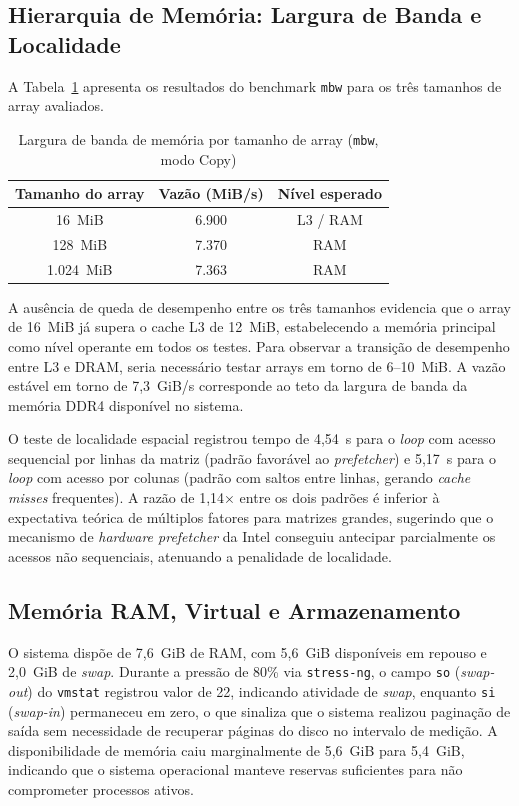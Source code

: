 \documentclass[12pt]{article}
\begin{document}
\subsection{Hierarquia de Memória: Largura de Banda e Localidade}

A Tabela~\ref{tab:mbw} apresenta os resultados do benchmark \texttt{mbw} para os três tamanhos de array avaliados.

\begin{table}[H]
\centering
\caption{Largura de banda de memória por tamanho de array (\texttt{mbw}, modo Copy)}
\label{tab:mbw}
\begin{tabular}{ccc}
\toprule
\textbf{Tamanho do array} & \textbf{Vazão (MiB/s)} & \textbf{Nível esperado} \\
\midrule
16~MiB   & 6.900  & L3 / RAM \\
128~MiB  & 7.370  & RAM \\
1.024~MiB & 7.363 & RAM \\
\bottomrule
\end{tabular}
\end{table}

A ausência de queda de desempenho entre os três tamanhos evidencia que o array de 16~MiB já supera o cache L3 de 12~MiB, estabelecendo a memória principal como nível operante em todos os testes. Para observar a transição de desempenho entre L3 e DRAM, seria necessário testar arrays em torno de 6--10~MiB. A vazão estável em torno de 7,3~GiB/s corresponde ao teto da largura de banda da memória DDR4 disponível no sistema.

O teste de localidade espacial registrou tempo de 4,54~s para o \textit{loop} com acesso sequencial por linhas da matriz (padrão favorável ao \textit{prefetcher}) e 5,17~s para o \textit{loop} com acesso por colunas (padrão com saltos entre linhas, gerando \textit{cache misses} frequentes). A razão de 1,14× entre os dois padrões é inferior à expectativa teórica de múltiplos fatores para matrizes grandes, sugerindo que o mecanismo de \textit{hardware prefetcher} da Intel conseguiu antecipar parcialmente os acessos não sequenciais, atenuando a penalidade de localidade.

\subsection{Memória RAM, Virtual e Armazenamento}

O sistema dispõe de 7,6~GiB de RAM, com 5,6~GiB disponíveis em repouso e 2,0~GiB de \textit{swap}. Durante a pressão de 80\% via \texttt{stress-ng}, o campo \texttt{so} (\textit{swap-out}) do \texttt{vmstat} registrou valor de 22, indicando atividade de \textit{swap}, enquanto \texttt{si} (\textit{swap-in}) permaneceu em zero, o que sinaliza que o sistema realizou paginação de saída sem necessidade de recuperar páginas do disco no intervalo de medição. A disponibilidade de memória caiu marginalmente de 5,6~GiB para 5,4~GiB, indicando que o sistema operacional manteve reservas suficientes para não comprometer processos ativos.
\end{document}
